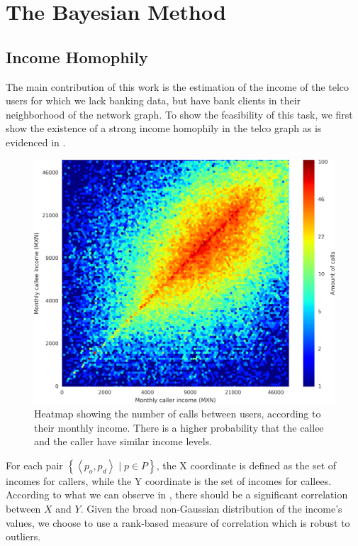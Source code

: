 \chapter{The Bayesian Method}
\label{sec:inference_methodology}

\section{Income Homophily}
\label{subsec:income_homophily}

The main contribution of this work is the estimation of the income of the telco users for which we lack banking data, but have bank clients in their neighborhood of the network graph. To show the feasibility of this task, we first show the existence of a strong income homophily in the telco graph as is evidenced in .

\begin{figure}
\centering
\includegraphics[width=\textwidth]{figures/Homophily_income_origin_target_1/Homophily_income_origin_target_1.png}
\caption{Heatmap showing the number of calls between users, according to their monthly income. There is a higher probability that the callee and the caller have similar income levels.}
\label{fig:homophily_heatmap}
\end{figure}

For each pair $\left\{ \left< p_o, p_d \right> \mid p \in P \right\}$, the X coordinate is defined as the set of incomes for callers, while the Y coordinate is the set of incomes for callees. According to what we can observe in , there should be a significant correlation between $X$ and $Y$. Given the broad non-Gaussian distribution of the income's values, we choose to use a rank-based measure of correlation which is robust to outliers.

